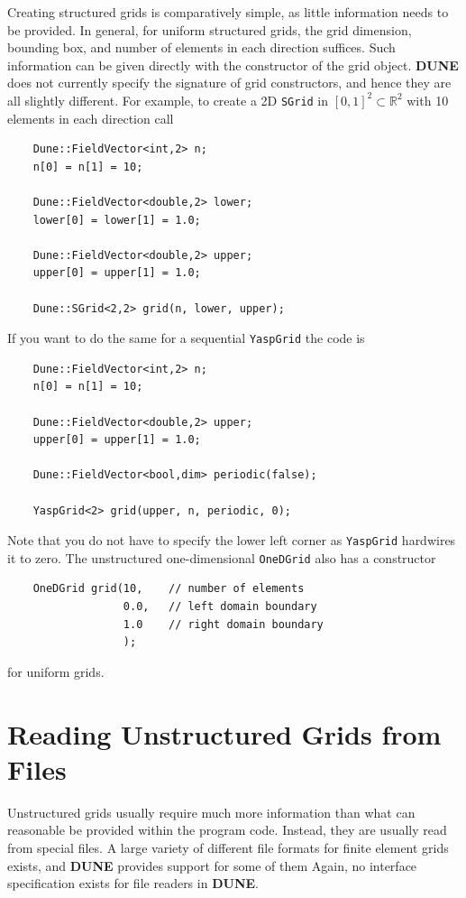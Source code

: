 \documentclass[11pt,a4paper,headinclude,footinclude,DIV16,normalheadings]{scrreprt}
\newcommand{\Dune}{{\sf\bfseries DUNE}\xspace}
\begin{document}
Creating structured grids is comparatively simple, as little information
needs to be provided.  In general, for uniform structured grids, the grid
dimension, bounding box, and number of elements in each direction suffices.
Such information can be given directly with the constructor of the grid
object. \Dune does not currently specify the signature of grid constructors,
and hence they are all slightly different.  For example, to create a 2D
\lstinline!SGrid! in $[0,1]^2 \subset \mathbb{R}^2$ with 10 elements in
each direction call
\begin{lstlisting}
    Dune::FieldVector<int,2> n;
    n[0] = n[1] = 10;

    Dune::FieldVector<double,2> lower;
    lower[0] = lower[1] = 1.0;

    Dune::FieldVector<double,2> upper;
    upper[0] = upper[1] = 1.0;

    Dune::SGrid<2,2> grid(n, lower, upper);
\end{lstlisting}
If you want to do the same for a sequential \lstinline!YaspGrid! the code is
\begin{lstlisting}
    Dune::FieldVector<int,2> n;
    n[0] = n[1] = 10;

    Dune::FieldVector<double,2> upper;
    upper[0] = upper[1] = 1.0;

    Dune::FieldVector<bool,dim> periodic(false);
    
    YaspGrid<2> grid(upper, n, periodic, 0);
\end{lstlisting}
Note that you do not have to specify the lower left corner as \lstinline!YaspGrid!
hardwires it to zero.  The unstructured one-dimensional \lstinline!OneDGrid!
also has a constructor
\begin{lstlisting}
    OneDGrid grid(10,    // number of elements 
                  0.0,   // left domain boundary
                  1.0    // right domain boundary
                  );
\end{lstlisting}
for uniform grids.

\section{Reading Unstructured Grids from Files}

Unstructured grids usually require much more information than what can
reasonable be provided within the program code.  Instead, they are usually
read from special files.  A large variety of different file formats for
finite element grids exists, and \Dune provides support for some of them
Again, no interface specification exists for file readers in \Dune.
\end{document}

